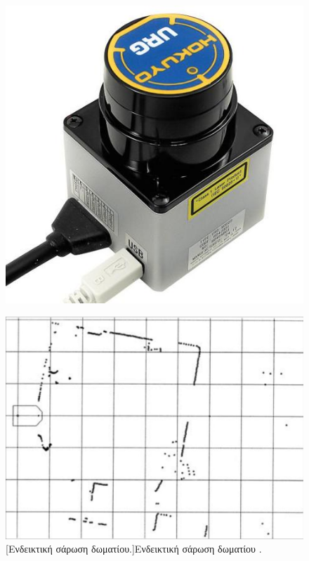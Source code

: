 \begin{enumerate}
\begin{figure}[!ht]
	\begin{minipage}[t]{.49\textwidth}
 		\centering
		\includegraphics[width=0.6\linewidth]{Chapters/Chapter2/Figures/hokuyo.jpg}
		\label{fig:hokuyo}
	\end{minipage}
	\begin{minipage}[t]{.49\textwidth}		
		\centering
 		\centering
		\includegraphics[width=0.75\linewidth]{Chapters/Chapter2/Figures/laser_scan.jpg}
		[Ενδεικτική σάρωση δωματίου.]{Ενδεικτική σάρωση δωματίου \cite{autonomous_land_vehicles}.}
		\label{fig:hokuyo_rays}
	\end{minipage}
\end{figure}

\bigskip


\end{enumerate}
